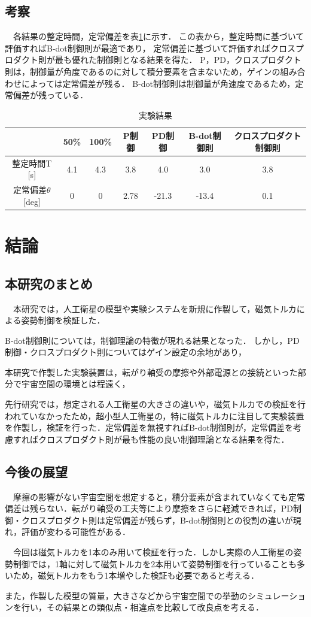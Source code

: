 \subsection{考察}
　各結果の整定時間，定常偏差を表\ref{table:result}に示す．
この表から，整定時間に基づいて評価すればB-dot制御則が最適であり，
定常偏差に基づいて評価すればクロスプロダクト則が最も優れた制御則となる結果を得た．
P，PD，クロスプロダクト則は，制御量が角度であるのに対して積分要素を含まないため，ゲインの組み合わせによっては定常偏差が残る．
B-dot制御則は制御量が角速度であるため，定常偏差が残っている．

\begin{table}[H]
	\centering
	\caption{実験結果}
	\label{table:result}
	\begin{tabular}{|c||c|c|c|c|c|c|}
		\hline
		 & 50\% & 100\% & P制御 & PD制御 & B-dot制御則 & クロスプロダクト制御則 \\ \hline
		整定時間T [s] & 4.1 & 4.3 & 3.8 & 4.0 & 3.0 & 3.8 \\ \hline
		定常偏差$\theta$ [deg] & 0 & 0 & 2.78 & -21.3 & -13.4 & 0.1 \\ \hline
	\end{tabular}
\end{table}


\newpage
\section{結論}
\subsection{本研究のまとめ}
　本研究では，人工衛星の模型や実験システムを新規に作製して，磁気トルカによる姿勢制御を検証した．

B-dot制御則については，制御理論の特徴が現れる結果となった．
しかし，PD制御・クロスプロダクト則についてはゲイン設定の余地があり，

本研究で作製した実験装置は，転がり軸受の摩擦や外部電源との接続といった部分で宇宙空間の環境とは程遠く，


先行研究では，想定される人工衛星の大きさの違いや，磁気トルカでの検証を行われていなかったため，超小型人工衛星の，特に磁気トルカに注目して実験装置を作製し，検証を行った．定常偏差を無視すればB-dot制御則が，定常偏差を考慮すればクロスプロダクト則が最も性能の良い制御理論となる結果を得た．
\subsection{今後の展望}

　摩擦の影響がない宇宙空間を想定すると，積分要素が含まれていなくても定常偏差は残らない．転がり軸受の工夫等により摩擦をさらに軽減できれば，PD制御・クロスプロダクト則は定常偏差が残らず，B-dot制御則との役割の違いが現れ，評価が変わる可能性がある． 

　今回は磁気トルカを1本のみ用いて検証を行った．しかし実際の人工衛星の姿勢制御では，1軸に対して磁気トルカを2本用いて姿勢制御を行っていることも多いため，磁気トルカをもう1本増やした検証も必要であると考える．

また，作製した模型の質量，大きさなどから宇宙空間での挙動のシミュレーションを行い，その結果との類似点・相違点を比較して改良点を考える．